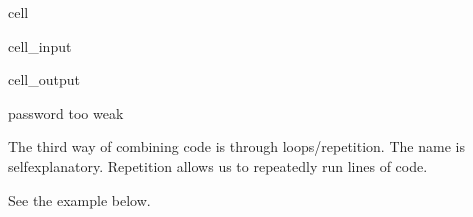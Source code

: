 \documentclass[letterpaper,10pt,english]{jupyterBook}
\begin{document}
\begin{sphinxuseclass}{cell}\begin{sphinxVerbatimInput}

\begin{sphinxuseclass}{cell_input}
\begin{sphinxVerbatim}[commandchars=\\\{\}]
  

   
\end{sphinxVerbatim}

\end{sphinxuseclass}\end{sphinxVerbatimInput}
\begin{sphinxVerbatimOutput}

\begin{sphinxuseclass}{cell_output}
\begin{sphinxVerbatim}[commandchars=\\\{\}]
password too weak
\end{sphinxVerbatim}

\end{sphinxuseclass}\end{sphinxVerbatimOutput}

\end{sphinxuseclass}
\sphinxAtStartPar
The third way of combining code is through loops/repetition. The name is self\sphinxhyphen{}explanatory. Repetition allows us to repeatedly run lines of code.

\sphinxAtStartPar
See the example below.
\end{document}
